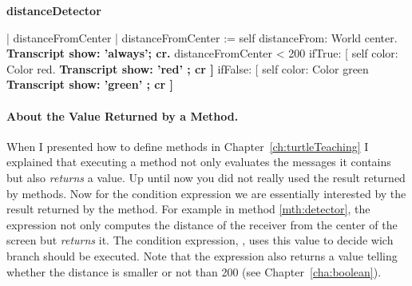 \begin{method}\label{mth:detectorTrans}
\textbf{distanceDetector}

   | distanceFromCenter | 
   distanceFromCenter := self distanceFrom: World center.
   \textbf{Transcript show: 'always'; cr.}
   distanceFromCenter < 200
      ifTrue: [ self color: Color red.
              \textbf{Transcript show: 'red' ; cr ]}
      ifFalse: [ self color: Color green
               \textbf{Transcript show: 'green' ; cr ]}
\end{method}



%


\paragraph{About the Value Returned by a Method.}
When I presented how to define methods in Chapter~\ref{ch:turtleTeaching} I explained that executing a method not only evaluates the messages it contains but also \emph{returns} a value.  Up until now you did not really used the result returned by methods. Now for the condition expression we are essentially interested by the result returned by the method. For example in method \ref{mth:detector}, the expression   not only computes the distance of the receiver from the center of the screen but \textit{returns} it.  The condition expression, , uses this value to decide wich branch should be executed. Note that the expression  also returns a value telling whether the distance is smaller or not than 200 (see Chapter~\ref{cha:boolean}). 

